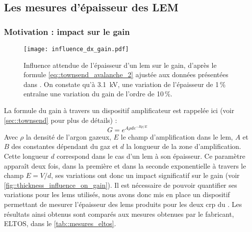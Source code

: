     \subsection{Les mesures d’épaisseur des LEM}\label{sec::epaisseur}
        
      \subsubsection{Motivation : impact sur le gain}
            
        \begin{figure}[!htb]
          \centering
          \texttt{[image: influence\_dx\_gain.pdf]}
          \caption[Influence de l'épaisseur d'un LEM sur le gain]{Influence attendue de l'épaisseur d'un \gls{lem} sur le gain, d'après le formule \eqref{eq::townsend_avalanche_2} ajustée aux données présentées dans \cite{Cantini2014}. On constate qu'à \SI{3.1}{\kilo\volt}, une variation de l'épaisseur de 1\,\% entraîne une variation du gain de l'ordre de 10\,\%.}
          \label{fig::thickness_influence_on_gain}
        \end{figure}
            
        La formule du gain à travers un dispositif amplificateur est rappelée ici (voir \autoref{sec::townsend} pour plus de détails) :
        \begin{equation}\label{eq::townsend_avalanche_2}
          G = e^{A\rho d e^{-B\rho /E}}
        \end{equation}
        Avec $\rho$ la densité de l'argon gazeux, $E$ le champ d'amplification dans le \gls{lem}, $A$ et $B$ des constantes dépendant du gaz et $d$ la longueur de la zone d'amplification. Cette longueur $d$ correspond dans le cas d'un \gls{lem} à son épaisseur. Ce paramètre apparaît deux fois, dans la première et dans la seconde exponentielle à travers le champ $E = V/d$, ses variations ont donc un impact significatif sur le gain (voir \autoref{fig::thickness_influence_on_gain}). Il est nécessaire de pouvoir quantifier ses variations pour les \glspl{lem} utilisés, nous avons donc mis en place un dispositif permettant de mesurer l'épaisseur des \glspl{lem} produits pour les deux \gls{crp} du \SSS{}. Les résultats ainsi obtenus sont comparés aux mesures obtenues par le fabricant, ELTOS, dans le \autoref{tab::mesures_eltos}.
                
